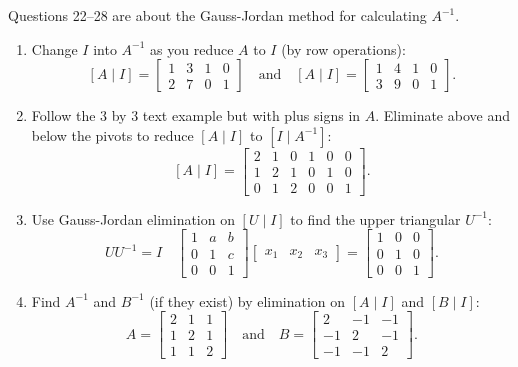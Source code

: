 \documentclass[14pt, a4paper]{article}
\begin{document}
\noindent Questions 22--28 are about the Gauss-Jordan method for calculating $A^{-1}$.

\begin{enumerate}[resume]
    \item Change $I$ into $A^{-1}$ as you reduce $A$ to $I$ (by row operations):
          \[
              [A\mid I] = \begin{bmatrix} 1 & 3 & 1 & 0 \\ 2 & 7 & 0 & 1 \end{bmatrix}
              \quad\text{and}\quad
              [A\mid I] = \begin{bmatrix} 1 & 4 & 1 & 0 \\ 3 & 9 & 0 & 1 \end{bmatrix}.
          \]

    \item Follow the 3 by 3 text example but with plus signs in $A$. Eliminate above and below the pivots to reduce $[A\mid I]$ to $[I\mid A^{-1}]$:
          \[
              [A\mid I] = \begin{bmatrix}
                  2 & 1 & 0 & 1 & 0 & 0 \\
                  1 & 2 & 1 & 0 & 1 & 0 \\
                  0 & 1 & 2 & 0 & 0 & 1
              \end{bmatrix}.
          \]

    \item Use Gauss-Jordan elimination on $[U\mid I]$ to find the upper triangular $U^{-1}$:
          \[
              UU^{-1} = I \quad
              \begin{bmatrix}
                  1 & a & b \\
                  0 & 1 & c \\
                  0 & 0 & 1
              \end{bmatrix}
              \begin{bmatrix}
                  x_1 & x_2 & x_3
              \end{bmatrix}
              =
              \begin{bmatrix}
                  1 & 0 & 0 \\
                  0 & 1 & 0 \\
                  0 & 0 & 1
              \end{bmatrix}.
          \]

    \item Find $A^{-1}$ and $B^{-1}$ (if they exist) by elimination on $[A\mid I]$ and $[B\mid I]$:
          \[
              A = \begin{bmatrix} 2 & 1 & 1 \\ 1 & 2 & 1 \\ 1 & 1 & 2 \end{bmatrix}
              \quad\text{and}\quad
              B = \begin{bmatrix} 2 & -1 & -1 \\ -1 & 2 & -1 \\ -1 & -1 & 2 \end{bmatrix}.
          \]


\end{enumerate}
\end{document}

